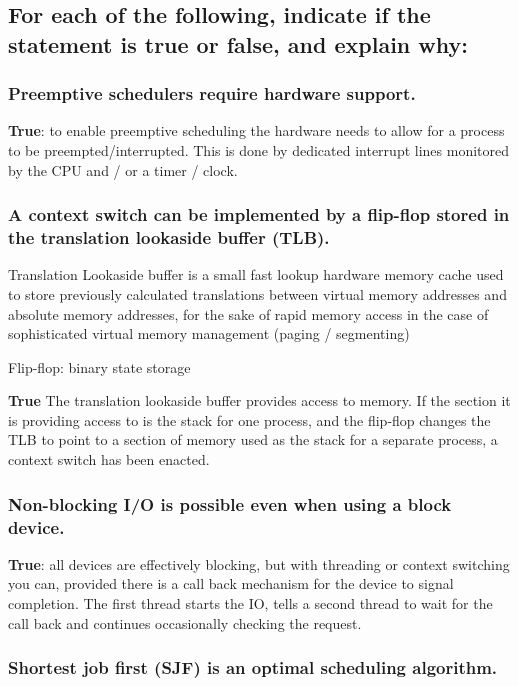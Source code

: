 \documentclass[]{article}
\begin{document}
    \subsection{For each of the following, indicate if the statement is true or false, and explain why:}

        \subsubsection{Preemptive schedulers require hardware support.}

            \textbf{True}: to enable preemptive scheduling the hardware needs to allow for a process to be preempted/interrupted. This is done by dedicated interrupt lines monitored by the CPU and / or a timer / clock.

        \subsubsection{A context switch can be implemented by a flip-flop stored in the translation lookaside buffer (TLB).}

            Translation Lookaside buffer is a small fast lookup hardware memory cache used to store previously calculated translations between virtual memory addresses and absolute memory addresses, for the sake of rapid memory access in the case of sophisticated virtual memory management (paging / segmenting)

            Flip-flop: binary state storage

             \textbf{True} The translation lookaside buffer provides access to memory. If the section it is providing access to is the stack for one process, and the flip-flop changes the TLB to point to a section of memory used as the stack for a separate process, a context switch has been enacted.

        \subsubsection{Non-blocking I/O is possible even when using a block device.}

            \textbf{True}: all devices are effectively blocking, but with threading or context switching you can, provided there is a call back mechanism for the device to signal completion. The first thread starts the IO, tells a second thread to wait for the call back and continues occasionally checking the request.

        \subsubsection{Shortest job first (SJF) is an optimal scheduling algorithm.}
\end{document}

